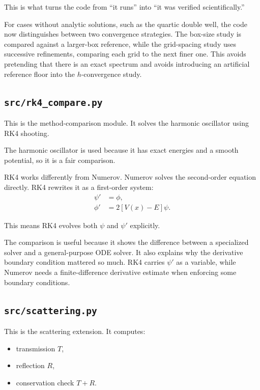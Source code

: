 \documentclass[11pt]{article}
\begin{document}
    This is what turns the code from ``it runs'' into ``it was verified scientifically.''

    For cases without analytic solutions, such as the quartic double well, the code now distinguishes between two convergence strategies. The box-size study is compared against a larger-box reference, while the grid-spacing study uses successive refinements, comparing each grid to the next finer one. This avoids pretending that there is an exact spectrum and avoids introducing an artificial reference floor into the $h$-convergence study.

    \subsection{\texttt{src/rk4\_compare.py}}

    This is the method-comparison module. It solves the harmonic oscillator using RK4 shooting.

    The harmonic oscillator is used because it has exact energies and a smooth potential, so it is a fair comparison.

    RK4 works differently from Numerov. Numerov solves the second-order equation directly. RK4 rewrites it as a first-order system:
    \begin{align}
        \psi' &= \phi, \\
        \phi' &= 2[V(x)-E]\psi.
    \end{align}

    This means RK4 evolves both $\psi$ and $\psi'$ explicitly.

    The comparison is useful because it shows the difference between a specialized solver and a general-purpose ODE solver. It also explains why the derivative boundary condition mattered so much. RK4 carries $\psi'$ as a variable, while Numerov needs a finite-difference derivative estimate when enforcing some boundary conditions.

    \subsection{\texttt{src/scattering.py}}

    This is the scattering extension. It computes:
    \begin{itemize}
        \item transmission $T$,
        \item reflection $R$,
        \item conservation check $T+R$.
    \end{itemize}
\end{document}
